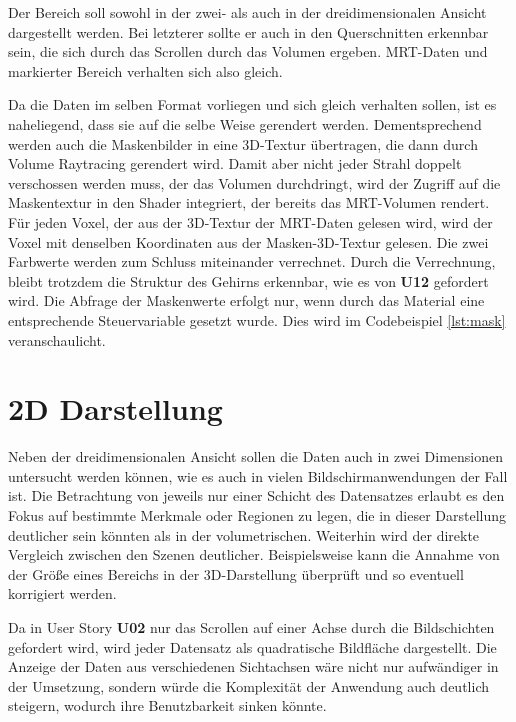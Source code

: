 Der Bereich soll sowohl in der zwei- als auch in der dreidimensionalen Ansicht dargestellt werden. Bei letzterer sollte er auch in den Querschnitten erkennbar sein, die sich durch das Scrollen durch das Volumen ergeben. MRT-Daten und markierter Bereich verhalten sich also gleich.

Da die Daten im selben Format vorliegen und sich gleich verhalten sollen, ist es naheliegend, dass sie auf die selbe Weise gerendert werden. Dementsprechend werden auch die Maskenbilder in eine 3D-Textur übertragen, die dann durch Volume Raytracing gerendert wird. Damit aber nicht jeder Strahl doppelt verschossen werden muss, der das Volumen durchdringt, wird der Zugriff auf die Maskentextur in den Shader integriert, der bereits das MRT-Volumen rendert. Für jeden Voxel, der aus der 3D-Textur der MRT-Daten gelesen wird, wird  der Voxel mit denselben Koordinaten aus der Masken-3D-Textur gelesen. Die zwei Farbwerte werden zum Schluss miteinander verrechnet. Durch die Verrechnung, bleibt trotzdem die Struktur des Gehirns erkennbar, wie es von \textbf{U12} gefordert wird. Die Abfrage der Maskenwerte erfolgt nur, wenn durch das Material eine entsprechende Steuervariable gesetzt wurde.
Dies wird im Codebeispiel \ref{lst:mask} veranschaulicht.



\section{2D Darstellung}

Neben der dreidimensionalen Ansicht sollen die Daten auch in zwei Dimensionen untersucht werden können, wie es auch in vielen Bildschirmanwendungen der Fall ist.
Die Betrachtung von jeweils nur einer Schicht des Datensatzes erlaubt es den Fokus auf bestimmte Merkmale oder Regionen zu legen, die in dieser Darstellung deutlicher sein könnten als in der volumetrischen. Weiterhin wird der direkte Vergleich zwischen den Szenen deutlicher. Beispielsweise kann die Annahme von der Größe eines Bereichs in der 3D-Darstellung überprüft und so eventuell korrigiert werden.

Da in User Story \textbf{U02} nur das Scrollen auf einer Achse durch die Bildschichten gefordert wird, wird jeder Datensatz als quadratische Bildfläche dargestellt.
Die Anzeige der Daten aus verschiedenen Sichtachsen wäre nicht nur aufwändiger in der Umsetzung, sondern würde die Komplexität der Anwendung auch deutlich steigern, wodurch ihre Benutzbarkeit sinken könnte. 

